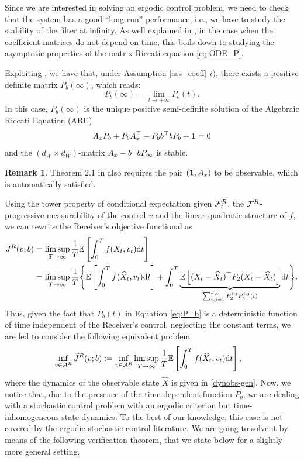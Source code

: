 \documentclass[a4paper,10pt]{article}
\newcommand{\EE}{\mathbb{E}}
\newcommand{\D}{\mathrm{d}}
\theoremstyle{definition}
\newtheorem{remark}[theorem]{Remark}
\theoremstyle{plain}
\numberwithin{equation}{section}
\begin{document}
Since we are interested in solving an ergodic control problem, we need to check that the system has a good ``long-run'' performance, i.e., we have to study the stability of the filter at infinity. As well explained in \cite[Section 5.4]{Davis_book}, in the case when the coefficient matrices do not depend on time, this boils down to studying the asymptotic properties of the matrix Riccati equation \eqref{eq:ODE_P}.  

Exploiting \cite[Theorem 2.1]{Wohnam68}, we have that, under Assumption \ref{ass_coeff} $i)$, there exists a positive definite matrix $P_b(\infty)$, which reads:
\begin{equation}
P_b(\infty) = \lim_{t \rightarrow +\infty} P_b(t).
\end{equation}
In this case, $P_b(\infty)$ is the unique positive semi-definite solution of the Algebraic Riccati Equation (ARE) 
\begin{equation}
A_{\rm x} P_b + P_b A_{\rm x}^\top - P_b b^\top b P_b +  \mathbf{1} =0
\end{equation}
and the $(d_W \times d_W)$-matrix $A_{\rm x} - b^\top b P_\infty$ is stable.

\begin{remark}
Theorem 2.1 in \cite{Wohnam68} also requires the pair $(\mathbf 1, A_{\rm x})$ to be observable, which is automatically satisfied.
\end{remark}

Using the tower property of conditional expectation given $\mathcal F_t ^{\rm R}$, the $\mathcal F^{\rm R}$-progressive measurability of the control $v$ and the linear-quadratic structure of $f$, we can rewrite the Receiver's objective functional as
\begin{align*}
    J^{\rm R}(v;b) 
    & = \limsup_{T \to \infty}\frac{1}{T}\EE \left[ \int_0^T f(X_t,v_t) \D t \right]\\
    & = \limsup_{T \to \infty}\frac{1}{T}\Bigg\{ \EE \left[ \int_0^T f(\widehat{X}_t,v_t) \D t \right] + \int_0^T \underbrace{\EE \left[ (X_t -\widehat{X}_t)^\top F_2 (X_t -\widehat{X}_t) \right]}_{\sum_{i,j=1}^{d_W} F_2 ^{i,j} P^{i,j} _b(t) }\D t\Bigg\}.
\end{align*}
Thus, given the fact that $P_b(t)$ in Equation \eqref{eq:P_b} is a deterministic function of time independent of the Receiver's control, neglecting the constant terms, we are led to consider the following equivalent problem
\begin{align} \label{Receiver_pb}
    \inf_{v \in \mathcal A^{\rm R}}  \widetilde J^{\rm R}(v ; b) 
    & := \inf_{v \in \mathcal A^{\rm R}} \limsup_{T \to \infty}\frac{1}{T}\EE \left[ \int_0^T f (\widehat{X}_t,v_t) \D t \right],
\end{align}
where the dynamics of the observable state $\widehat{X}$ is given in \eqref{dynobs-gen}. 
Now, we notice that, due to the presence of the time-dependent function $P_b$, we are dealing with a stochastic control problem with an ergodic criterion but time-inhomogeneous state dynamics. To the best of our knowledge, this case is not covered by the ergodic stochastic control literature. We are going to solve it by means of the following verification theorem, that we state below for a slightly more general setting. 
\end{document}
